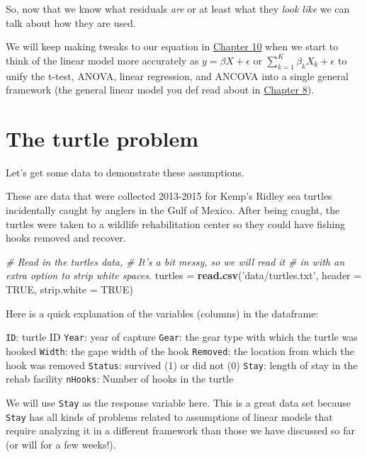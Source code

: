 \documentclass[
]{book}
\newenvironment{Shaded}{\begin{snugshade}}{\end{snugshade}}
\newcommand{\CommentTok}[1]{\textcolor[rgb]{0.56,0.35,0.01}{\textit{#1}}}
\newcommand{\DataTypeTok}[1]{\textcolor[rgb]{0.13,0.29,0.53}{#1}}
\newcommand{\KeywordTok}[1]{\textcolor[rgb]{0.13,0.29,0.53}{\textbf{#1}}}
\newcommand{\NormalTok}[1]{#1}
\newcommand{\OtherTok}[1]{\textcolor[rgb]{0.56,0.35,0.01}{#1}}
\newcommand{\StringTok}[1]{\textcolor[rgb]{0.31,0.60,0.02}{#1}}
\begin{document}
So, now that we know what residuals \emph{are} or at least what they \emph{look like} we can talk about how they are used.

We will keep making tweaks to our equation in \protect\hyperlink{Chapter10}{Chapter 10} when we start to think of the linear model more accurately as \(y = \beta X + \epsilon\) or \(\sum_{k=1}^{K} \beta_k X_k + \epsilon\) to unify the t-test, ANOVA, linear regression, and ANCOVA into a single general framework (the general linear model you def read about in \protect\hyperlink{Chapter8}{Chapter 8}).

\hypertarget{the-turtle-problem}{%
\section{The turtle problem}\label{the-turtle-problem}}

Let's get some data to demonstrate these assumptions.

These are data that were collected 2013-2015 for Kemp's Ridley sea turtles incidentally caught by anglers in the Gulf of Mexico. After being caught, the turtles were taken to a wildlife rehabilitation center so they could have fishing hooks removed and recover.

\begin{Shaded}
\begin{Highlighting}[]
\CommentTok{# Read in the turtles data,}
\CommentTok{# It's a bit messy, so we will read it}
\CommentTok{# in with an extra option to strip white spaces.}
\NormalTok{turtles =}\StringTok{ }\KeywordTok{read.csv}\NormalTok{(}\StringTok{'data/turtles.txt'}\NormalTok{, }\DataTypeTok{header =} \OtherTok{TRUE}\NormalTok{, }\DataTypeTok{strip.white =} \OtherTok{TRUE}\NormalTok{)}
\end{Highlighting}
\end{Shaded}

Here is a quick explanation of the variables (columns) in the dataframe:

\texttt{ID}: turtle ID
\texttt{Year}: year of capture
\texttt{Gear}: the gear type with which the turtle was hooked
\texttt{Width}: the gape width of the hook
\texttt{Removed}: the location from which the hook was removed
\texttt{Status}: survived (1) or did not (0)
\texttt{Stay}: length of stay in the rehab facility
\texttt{nHooks}: Number of hooks in the turtle

We will use \texttt{Stay} as the response variable here. This is a great data set because \texttt{Stay} has all kinds of problems related to assumptions of linear models that require analyzing it in a different framework than those we have discussed so far (or will for a few weeks!).
\end{document}
